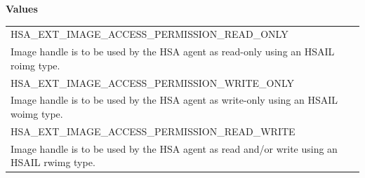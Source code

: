 \documentclass[final,oneside]{book}
\newcommand{\reftyp}[1]{#1}
\newcommand{\refenu}[1]{\reftyp{#1}}
\begin{document}
\noindent\textbf{Values}\\[-5mm]
\begin{longtable}{@{\hspace{2em}}p{\linewidth-2em}}
\hspace{-2em}\refenu{HSA_\-EXT_\-IMAGE_\-ACCESS_\-PERMISSION_\-READ_\-ONLY}\\Image handle is to be used by the HSA agent as read-only using an HSAIL roimg type.\\[2mm]
\hspace{-2em}\refenu{HSA_\-EXT_\-IMAGE_\-ACCESS_\-PERMISSION_\-WRITE_\-ONLY}\\Image handle is to be used by the HSA agent as write-only using an HSAIL woimg type.\\[2mm]
\hspace{-2em}\refenu{HSA_\-EXT_\-IMAGE_\-ACCESS_\-PERMISSION_\-READ_\-WRITE}\\Image handle is to be used by the HSA agent as read and/or write using an HSAIL rwimg type.
\end{longtable}
\end{document}

